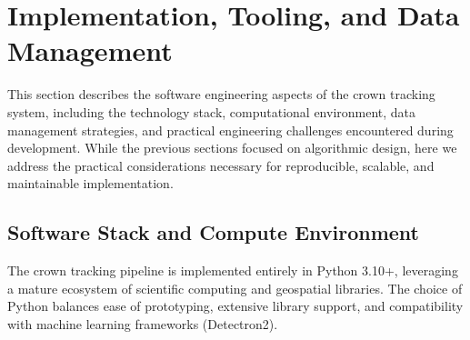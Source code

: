 \section{Implementation, Tooling, and Data Management}

This section describes the software engineering aspects of the crown tracking system, including the technology stack, computational environment, data management strategies, and practical engineering challenges encountered during development. While the previous sections focused on algorithmic design, here we address the practical considerations necessary for reproducible, scalable, and maintainable implementation.

\subsection{Software Stack and Compute Environment}

The crown tracking pipeline is implemented entirely in Python 3.10+, leveraging a mature ecosystem of scientific computing and geospatial libraries. The choice of Python balances ease of prototyping, extensive library support, and compatibility with machine learning frameworks (Detectron2).

